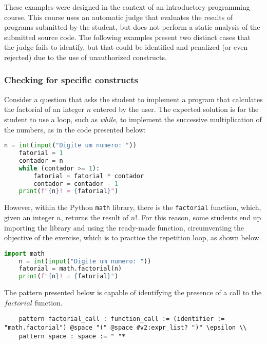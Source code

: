 These examples were designed in the context of an introductory programming course. 
This course uses an automatic judge that evaluates the results of programs 
submitted by the student, but does not perform a static analysis of the submitted 
source code. The following examples present two distinct cases that the judge 
fails to identify, but that could be identified and penalized (or even rejected) due 
to the use of unauthorized constructs.

\subsubsection{Checking for specific constructs}
    
Consider a question that asks the student to implement a program that 
calculates the factorial of an integer \(n\) entered by the user.
The expected solution is for the student to use a loop, such as \textit{while}, 
to implement the successive multiplication of the numbers, as in the code 
presented below:

\begin{lstlisting}[language=Python]
    n = int(input("Digite um numero: "))
    fatorial = 1
    contador = n
    while (contador >= 1):
        fatorial = fatorial * contador
        contador = contador - 1
    print(f"{n}! = {fatorial}")
\end{lstlisting}

However, within the Python \texttt{math} library, there is the \texttt{factorial} 
function, which, given an integer \(n\), returns the result of \(n!\).
For this reason, some students end up importing the library and using the 
ready-made function, circumventing the objective of the exercise, which is 
to practice the repetition loop, as shown below.

\begin{lstlisting}[language=Python]
    import math
    n = int(input("Digite um numero: "))
    fatorial = math.factorial(n)
    print(f"{n}! = {fatorial}")
\end{lstlisting}


The pattern presented below is capable of identifying the presence of a call 
to the \(factorial\) function.

\begin{verbatim}
    pattern factorial_call : function_call := (identifier := "math.factorial") @space "(" @space #v2:expr_list? ")" \epsilon \\
    pattern space : space := " "*
\end{verbatim}

